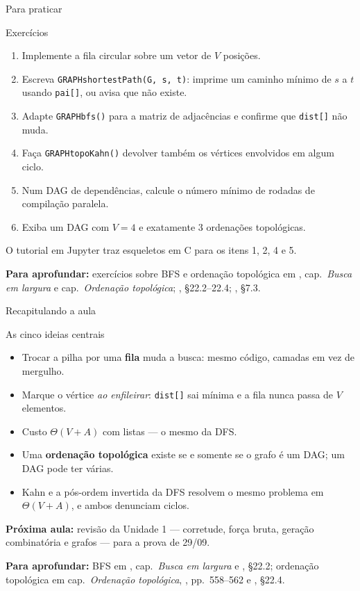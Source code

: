 \documentclass[aspectratio=169]{beamer}
\newcommand{\fonte}[1]{%
  \vfill
  {\tiny\color{gray!55!black}\textbf{Para aprofundar:} #1\par}%
}
\begin{document}
\begin{frame}{Para praticar}
  \begin{block}{Exercícios}
    {\small
    \begin{enumerate}\scriptsize
      \item Implemente a fila circular sobre um vetor de $V$ posições.
      \item Escreva \texttt{GRAPHshortestPath(G, s, t)}: imprime um caminho
            mínimo de $s$ a $t$ usando \texttt{pai[]}, ou avisa que não existe.
      \item Adapte \texttt{GRAPHbfs()} para a matriz de adjacências e confirme
            que \texttt{dist[]} não muda.
      \item Faça \texttt{GRAPHtopoKahn()} devolver também os vértices
            envolvidos em algum ciclo.
      \item Num DAG de dependências, calcule o número mínimo de rodadas de
            compilação paralela.
      \item Exiba um DAG com $V = 4$ e exatamente 3 ordenações topológicas.
    \end{enumerate}}
  \end{block}
  {\scriptsize O tutorial em Jupyter traz esqueletos em C para os itens 1, 2, 4 e 5.}
  \fonte{exercícios sobre BFS e ordenação topológica em \cite{feofiloff2020algoritmos}, cap.\ \emph{Busca em largura} e
  cap.\ \emph{Ordenação topológica}; \cite{cormen2009introduction},
  §22.2--22.4; \cite{ziviani2011projeto}, §7.3.}
\end{frame}

\begin{frame}{Recapitulando a aula}
  \begin{block}{As cinco ideias centrais}
    \begin{itemize}\scriptsize
      \item Trocar a pilha por uma \textbf{fila} muda a busca: mesmo código,
            camadas em vez de mergulho.
      \item Marque o vértice \emph{ao enfileirar}: \texttt{dist[]} sai mínima e
            a fila nunca passa de $V$ elementos.
      \item Custo $\Theta(V+A)$ com listas --- o mesmo da DFS.
      \item Uma \textbf{ordenação topológica} existe se e somente se o grafo é
            um DAG; um DAG pode ter várias.
      \item Kahn e a pós-ordem invertida da DFS resolvem o mesmo problema em
            $\Theta(V+A)$, e ambos denunciam ciclos.
    \end{itemize}
  \end{block}
  {\scriptsize \textbf{Próxima aula:} revisão da Unidade 1 --- corretude, força
  bruta, geração combinatória e grafos --- para a prova de 29/09.}
  \fonte{BFS em \cite{feofiloff2020algoritmos}, cap.\ \emph{Busca em largura} e \cite{cormen2009introduction}, §22.2;
  ordenação topológica em cap.\ \emph{Ordenação topológica}, \cite{kahn1962topological}, pp.~558--562 e
  \cite{cormen2009introduction}, §22.4.}
\end{frame}
\end{document}
